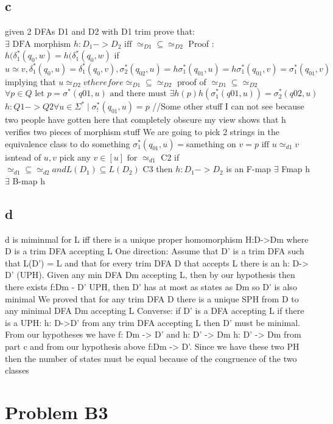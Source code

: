 \documentclass[12pt]{article}
\begin{document}
\subsection*{c}
given 2 DFAs D1 and D2 with D1 trim prove that:
 $\exists \text{ DFA morphism } h:D_1 -> D_2 \text{ iff } \simeq_{D1} \subseteq \simeq_{D2}$
Proof :  $h(\delta^{*}_1(q_0, w) = h(\delta^{*}_1(q_0, w)$
if $u \simeq v , \delta^{*}_1(q_0, u) = \delta^{*}_1(q_0, v) , \sigma^{*}_2(q_{02}, u) = h\sigma^{*}_1(q_{01}, u) = h\sigma^{*}_1(q_{01}, v) = \sigma^{*}_1(q_{01}, v)  $ implying that $u \simeq_{D2} v therefore \simeq_{D1} \subseteq \simeq_{D2}$
proof of $\simeq_{D1} \subseteq \simeq_{D2}$
$\forall p \in Q \text{ let } p = \sigma^*(q01, u) \text{ and there must } \exists h(p) h(\sigma_1^*(q01, u)) = \sigma_2^*(q02, u)$
$h: Q1 -> Q2 \forall u \in \Sigma^*\mid \sigma^*_!(q_{01}, u) = p$
//Some other stuff I can not see because two people have gotten here that completely obscure my view
shows that h verifies two pieces of morphism stuff
We are going to pick 2 strings in the equivalence class to do something
$\sigma^*_1(q_{01},u) = $samething on $v = p \text{ iff } u \simeq_{d1} v$
isntead of $u,v$ pick any $v \in [u] \text{ for } \simeq_{d1}$
C2 if $\simeq_{d1} \subseteq \simeq_{d2} and L(D_1) \subseteq L(D_2)$
C3 then $h: D_1 -> D_2$ is an F-map
$\exists$ Fmap h 
$\exists$ B-map h

\subsection*{d}
d is miminmal for L iff there is a unique proper homomorphism H:D->Dm where D is a trim DFA accepting L
	One direction:
		Assume that D' is a trim DFA such that L(D') = L and that for every trim DFA D that accepts L there is an h: D-> D' (UPH).  Given any min DFA Dm accepting L, then by our hypothesis then there exists f:Dm - D' UPH, then D' has at most as states as Dm so D' is also minimal
	We proved that for any trim DFA D there is a unique SPH from D to any minimal DFA Dm accepting L
Converse: if D' is a DFA accepting L if there is a UPH: h: D->D' from any trim DFA accepting L then D' must be minimal.
	From our hypotheses we have f: Dm -> D' and h: D' -> Dm
	h: D' -> Dm from part c and from our hypothesis above f:Dm -> D'.  Since we have these two PH then the number of states must be equal because of the congruence of the two classes

\section*{Problem B3}
\end{document}
